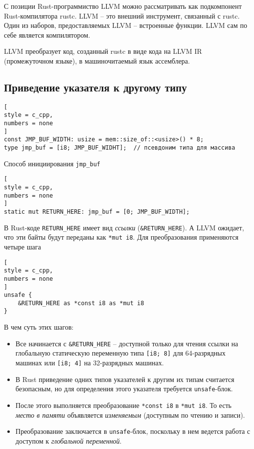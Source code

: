 \documentclass[%
	11pt,
	a4paper,
	utf8,
		]{article}
\begin{document}
С позиции Rust-программиство LLVM можно рассматривать как подкомпонент Rust-компилятора rustc. LLVM -- это внешний инструмент, связанный с rustc. Один из наборов, предоставляемых LLVM -- встроенные функции. LLVM сам по себе является компилятором.

LLVM преобразует код, созданный rustc в виде кода на LLVM IR (промежуточном языке), в машиночитаемый язык ассемблера.

\subsection{Приведение указателя к другому типу}

\begin{lstlisting}[
style = c_cpp,
numbers = none
]
const JMP_BUF_WIDTH: usize = mem::size_of::<usize>() * 8;
type jmp_buf = [i8; JMP_BUF_WIDHT];  // псевдоним типа для массива
\end{lstlisting}

Способ инициирования \verb|jmp_buf|
\begin{lstlisting}[
style = c_cpp,
numbers = none	
]
static mut RETURN_HERE: jmp_buf = [0; JMP_BUF_WIDTH];
\end{lstlisting}

В Rust-коде \verb*|RETURN_HERE| имеет вид \emph{ссылки} (\verb|&RETURN_HERE|). А LLVM ожидает, что эти байты будут переданы как \verb|*mut i8|. Для преобразования применяются четыре шага
\begin{lstlisting}[
style = c_cpp,
numbers = none
]
unsafe {
    &RETURN_HERE as *const i8 as *mut i8
}
\end{lstlisting}

В чем суть этих шагов:
\begin{itemize}
	\item Все начинается с \verb|&RETURN_HERE| -- доступной только для чтения ссылки на глобальную статическую переменную типа \verb|[i8; 8]| для 64-разрядных машинах или \verb|[i8; 4]| на 32-разрядных машинах.
	
	\item В Rust приведение одних типов указателей к другим их типам считается безопасным, но для определения этого указателя требуется \verb|unsafe|-блок.
	
	\item После этого выполняется преобразование \verb|*const i8| в \verb|*mut i8|. То есть \emph{место в памяти} объявляется \emph{изменяемым} (доступным по чтению и записи).
	
	\item Преобразование заключается в \verb|unsafe|-блок, поскольку в нем ведется работа с доступом к \emph{глобальной переменной}.
\end{itemize}
\end{document}
